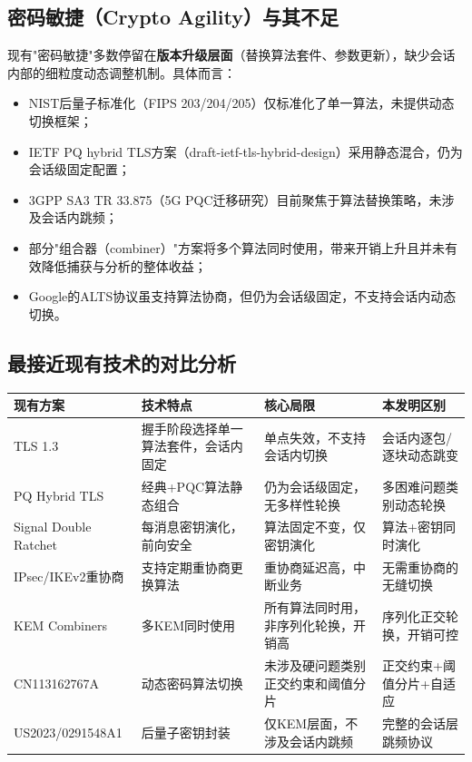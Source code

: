﻿\documentclass[12pt,a4paper]{article}
\begin{document}
\subsection{密码敏捷（Crypto Agility）与其不足}

现有"密码敏捷"多数停留在\textbf{版本升级层面}（替换算法套件、参数更新），缺少会话内部的细粒度动态调整机制。具体而言：

\begin{itemize}
    \item NIST后量子标准化（FIPS 203/204/205）仅标准化了单一算法，未提供动态切换框架；
    \item IETF PQ hybrid TLS方案（draft-ietf-tls-hybrid-design）采用静态混合，仍为会话级固定配置；
    \item 3GPP SA3 TR 33.875（5G PQC迁移研究）目前聚焦于算法替换策略，未涉及会话内跳频；
    \item 部分"组合器（combiner）"方案将多个算法同时使用，带来开销上升且并未有效降低捕获与分析的整体收益；
    \item Google的ALTS协议虽支持算法协商，但仍为会话级固定，不支持会话内动态切换。
\end{itemize}

\subsection{最接近现有技术的对比分析}

\begin{longtable}{|p{2.5cm}|p{4.0cm}|p{4.0cm}|p{4.0cm}|}
\hline
\textbf{现有方案} & \textbf{技术特点} & \textbf{核心局限} & \textbf{本发明区别} \\
\hline
\endhead
TLS 1.3 & 握手阶段选择单一算法套件，会话内固定 & 单点失效，不支持会话内切换 & 会话内逐包/逐块动态跳变 \\
\hline
PQ Hybrid TLS & 经典+PQC算法静态组合 & 仍为会话级固定，无多样性轮换 & 多困难问题类别动态轮换 \\
\hline
Signal Double Ratchet & 每消息密钥演化，前向安全 & 算法固定不变，仅密钥演化 & 算法+密钥同时演化 \\
\hline
IPsec/IKEv2重协商 & 支持定期重协商更换算法 & 重协商延迟高，中断业务 & 无需重协商的无缝切换 \\
\hline
KEM Combiners & 多KEM同时使用 & 所有算法同时用，非序列化轮换，开销高 & 序列化正交轮换，开销可控 \\
\hline
CN113162767A & 动态密码算法切换 & 未涉及硬问题类别正交约束和阈值分片 & 正交约束+阈值分片+自适应 \\
\hline
US2023/0291548A1 & 后量子密钥封装 & 仅KEM层面，不涉及会话内跳频 & 完整的会话层跳频协议 \\
\hline
\end{longtable}
\end{document}
